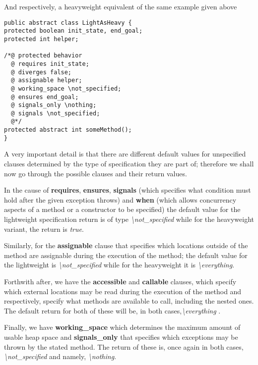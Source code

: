 \documentclass{article}
\begin{document}
\begin{center}
    And respectively, a heavyweight equivalent of the same example given above
\end{center}

\begin{lstlisting}[columns=fixed, basewidth=0.5em, basicstyle={\ttfamily}]
public abstract class LightAsHeavy {
protected boolean init_state, end_goal;
protected int helper;

/*@ protected behavior
  @	requires init_state;
  @	diverges false;
  @	assignable helper;
  @	working_space \not_specified;
  @	ensures end_goal;
  @	signals_only \nothing;
  @	signals \not_specified;
  @*/
protected abstract int someMethod();
}

\end{lstlisting}

A very important detail is that there are different default values for unspecified clauses determined by the type of specification they are part of; therefore we shall now go through the possible clauses and their return values.

In the cause of \textbf{requires}, \textbf{ensures}, \textbf{signals} (which specifies what condition must hold after the given exception throws) and \textbf{when} (which allows concurrency aspects of a method or a constructor to be specified) the default value for the lightweight specification return is of type \textit{\textbackslash not\_specified} while for the heavyweight variant, the return is \textit{true}.

Similarly, for the \textbf{assignable} clause that specifies which locations outside of the method are assignable during the execution of the method; the default value for the lightweight is \textit{\textbackslash not\_specified} while for the heavyweight it is \textit{\textbackslash everything}.

Forthwith after, we have the \textbf{accessible} and \textbf{callable} clauses, which specify which external locations may be read during the execution of the method and respectively, specify what methods are available to call, including the nested ones. The default return for both of these will be, in both cases,\textit{\textbackslash everything} .

Finally, we have \textbf{working\_space} which determines the maximum amount of usable heap space and \textbf{signals\_only} that specifies which exceptions may be thrown by the stated method. The return of these is, once again in both cases, \textit{\textbackslash not\_specified} and namely, \textit{\textbackslash nothing}. 
\end{document}
